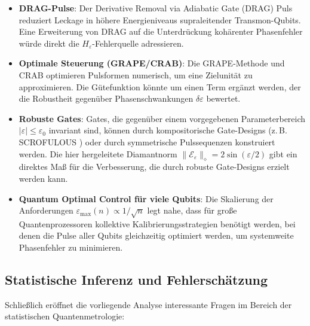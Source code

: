 ﻿\documentclass[11pt,a4paper]{article}
\theoremstyle{definition}
\newcommand{\eps}{\varepsilon}
\newcommand{\Heps}{H_{\!\varepsilon}}
\newcommand{\Fdiam}{\|\mathcal{E}_\eps\|_\diamond}
\begin{document}
\begin{itemize}
  \item \textbf{DRAG-Pulse}: Der Derivative Removal via Adiabatic Gate
        (DRAG) Puls \cite{Motzoi2009} reduziert Leckage in höhere Energieniveaus
        supraleitender Transmon-Qubits.  Eine Erweiterung von DRAG auf die
        Unterdrückung kohärenter Phasenfehler würde direkt die
        $\Heps$-Fehlerquelle adressieren.

  \item \textbf{Optimale Steuerung (GRAPE/CRAB)}: Die GRAPE-Methode
        \cite{Khaneja2005} und CRAB \cite{Caneva2011} optimieren Pulsformen
        numerisch, um eine Zielunität zu approximieren.  Die Gütefunktion
        könnte um einen Term ergänzt werden, der die Robustheit gegenüber
        Phasenschwankungen $\delta\eps$ bewertet.

  \item \textbf{Robuste Gates}: Gates, die gegenüber einem vorgegebenen
        Parameterbereich $|\eps| \leq \eps_0$ invariant sind, können durch
        kompositorische Gate-Designs (z.\,B. SCROFULOUS \cite{Cummins2003})
        oder durch symmetrische Pulssequenzen konstruiert werden.  Die
        hier hergeleitete Diamantnorm $\Fdiam = 2\sin(\eps/2)$ gibt ein
        direktes Maß für die Verbesserung, die durch robuste Gate-Designs
        erzielt werden kann.

  \item \textbf{Quantum Optimal Control für viele Qubits}: Die Skalierung
        der Anforderungen $\eps_{\max}(n) \propto 1/\sqrt{n}$ legt nahe, dass
        für große Quantenprozessoren kollektive Kalibrierungsstrategien
        benötigt werden, bei denen die Pulse aller Qubits gleichzeitig
        optimiert werden, um systemweite Phasenfehler zu minimieren.
\end{itemize}

\subsection{Statistische Inferenz und Fehlerschätzung}
\label{subsec:inference}

Schließlich eröffnet die vorliegende Analyse interessante Fragen im Bereich
der statistischen Quantenmetrologie:
\end{document}
